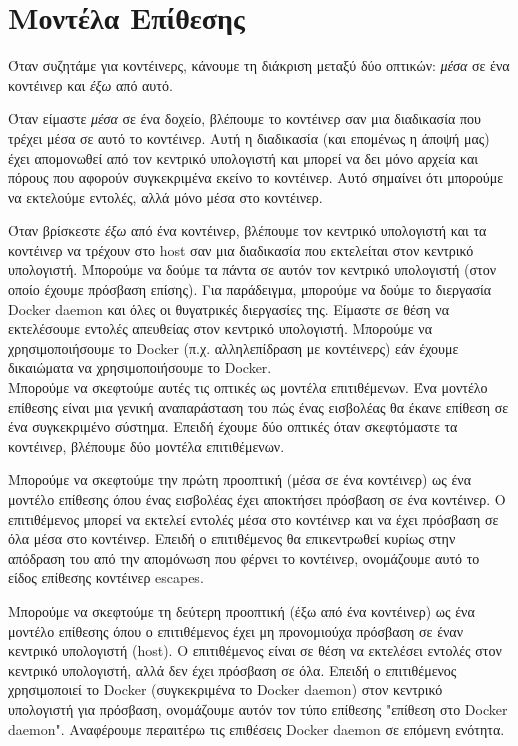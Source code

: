 \chapter{Μοντέλα Επίθεσης}
\label{attackModes}

Όταν συζητάμε για κοντέινερς, κάνουμε τη διάκριση μεταξύ δύο οπτικών: 
\emph{μέσα} σε ένα κοντέινερ και \emph{έξω} από αυτό.

Όταν είμαστε \emph{μέσα} σε ένα δοχείο, βλέπουμε το κοντέινερ σαν μια
διαδικασία που τρέχει μέσα σε αυτό το κοντέινερ. Αυτή η διαδικασία (και
επομένως η άποψή μας) έχει απομονωθεί από τον κεντρικό υπολογιστή και μπορεί να
δει μόνο αρχεία και πόρους που αφορούν συγκεκριμένα εκείνο το κοντέινερ. Αυτό
σημαίνει ότι μπορούμε να εκτελούμε εντολές, αλλά μόνο μέσα στο κοντέινερ.

Όταν βρίσκεστε \emph{έξω} από ένα κοντέινερ, βλέπουμε τον κεντρικό υπολογιστή
και τα κοντέινερ να τρέχουν στο
host σαν μια διαδικασία που εκτελείται στον κεντρικό υπολογιστή. Μπορούμε να
δούμε τα πάντα σε αυτόν τον κεντρικό υπολογιστή (στον οποίο έχουμε πρόσβαση
επίσης). Για παράδειγμα, μπορούμε να δούμε το διεργασία
\textlatin{Docker daemon} και όλες οι θυγατρικές διεργασίες της. Είμαστε σε
θέση να εκτελέσουμε εντολές απευθείας στον κεντρικό υπολογιστή. Μπορούμε να
χρησιμοποιήσουμε το \textlatin{Docker} (π.χ. αλληλεπίδραση με κοντέινερς) εάν
έχουμε δικαιώματα να χρησιμοποιήσουμε το \textlatin{Docker}. \\

Μπορούμε να σκεφτούμε αυτές τις οπτικές ως μοντέλα επιτιθέμενων. Ένα μοντέλο
επίθεσης είναι μια γενική αναπαράσταση του πώς ένας εισβολέας θα έκανε επίθεση
σε ένα συγκεκριμένο σύστημα. Επειδή έχουμε δύο οπτικές όταν σκεφτόμαστε τα
κοντέινερ, βλέπουμε δύο μοντέλα επιτιθέμενων.

Μπορούμε να σκεφτούμε την πρώτη προοπτική (μέσα σε ένα κοντέινερ) ως ένα μοντέλο
επίθεσης όπου ένας εισβολέας έχει αποκτήσει πρόσβαση σε ένα κοντέινερ.
Ο επιτιθέμενος μπορεί να εκτελεί εντολές μέσα στο κοντέινερ και να έχει
πρόσβαση σε όλα μέσα στο κοντέινερ. Επειδή ο επιτιθέμενος θα επικεντρωθεί
κυρίως στην απόδραση του από την απομόνωση που φέρνει το κοντέινερ, ονομάζουμε
αυτό το είδος επίθεσης κοντέινερ \textlatin{escapes}.

Μπορούμε να σκεφτούμε τη δεύτερη προοπτική (έξω από ένα κοντέινερ) ως ένα
μοντέλο επίθεσης όπου ο επιτιθέμενος έχει μη προνομιούχα πρόσβαση σε έναν
κεντρικό υπολογιστή (\textlatin{host}). Ο επιτιθέμενος είναι σε θέση να
εκτελέσει εντολές στον κεντρικό υπολογιστή, αλλά δεν έχει πρόσβαση
σε όλα. Επειδή ο επιτιθέμενος χρησιμοποιεί το \textlatin{Docker} (συγκεκριμένα
το \textlatin{Docker daemon}) στον κεντρικό υπολογιστή για πρόσβαση,
ονομάζουμε αυτόν τον τύπο επίθεσης "επίθεση στο \textlatin{Docker daemon}".
Αναφέρουμε περαιτέρω τις επιθέσεις \textlatin{Docker daemon} σε επόμενη ενότητα.

